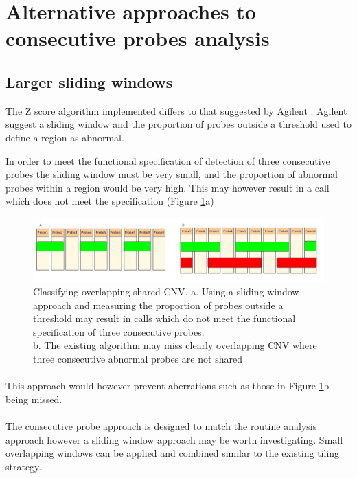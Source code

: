 \section{Alternative approaches to consecutive probes analysis}
\subsection{Larger sliding windows}
The Z score algorithm implemented differs to that suggested by Agilent \cite{agilent_technologies_agilent_2011}. Agilent suggest a sliding window and the proportion of probes outside a threshold used to define a region as abnormal.

In order to meet the functional specification of detection of three consecutive probes the sliding window must be very small, and the proportion of abnormal probes within a region would be very high. This may however result in a call which does not meet the specification (Figure \ref{fig:incorrectcallandalternatecomb}a)

\begin{figure}[h]
\centering
\includegraphics[width=1\linewidth]{./Figures/incorrectcallandalternatecomb}
\caption[Classifying overlapping shared CNV]{Classifying overlapping shared CNV. a. Using a sliding window approach and measuring the proportion of probes outside a threshold may result in calls which do not meet the functional specification of three consecutive probes.\\
b. The existing algorithm may miss clearly overlapping CNV where three consecutive abnormal probes are not shared}
\label{fig:incorrectcallandalternatecomb}
\end{figure}
\paragraph*{}
This approach would however prevent aberrations such as those in Figure \ref{fig:incorrectcallandalternatecomb}b being missed.
\paragraph*{}
The consecutive probe approach is designed to match the routine analysis approach however a sliding window approach may be worth investigating. Small overlapping windows can be applied and combined similar to the existing tiling strategy.

